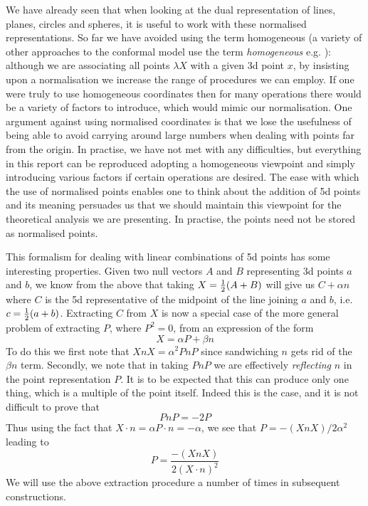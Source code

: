 We have already seen that when looking at the dual representation
of lines, planes, circles and spheres, it is useful to work with
these normalised representations. So far we have avoided using the
term homogeneous (a variety of other approaches to the conformal
model use the term \emph{homogeneous} e.g. \cite{oldwine}):
although we are associating all points $\lambda X$ with a given 3d
point $x$, by insisting upon a normalisation we increase the range
of procedures we can employ. If one were truly to use homogeneous
coordinates then for many operations there would be a variety of
factors to introduce, which would mimic our normalisation. One
argument against using normalised coordinates is that we lose the
usefulness of being able to avoid carrying around large numbers
when dealing with points far from the origin. In practise, we have
not met with any difficulties, but everything in this report can be
reproduced adopting a homogeneous viewpoint and simply introducing
various factors if certain operations are desired. The ease with
which the use of normalised points enables one to think about the
addition of 5d points and its meaning persuades us that we should
maintain this viewpoint for the theoretical analysis we are
presenting. In practise, the points need not be stored as
normalised points.

 This formalism for dealing with linear combinations
of 5d points has some interesting properties. Given two
null vectors $A$ and $B$ representing 3d points $a$ and
$b$, we know from the above that taking $X =\frac{1}{2} (A +
B)$ will give us  $C + \alpha n$ where $C$ is the 5d
representative of the midpoint of the line joining $a$
and $b$, i.e. $c=\frac{1}{2} (a+b)$. Extracting $C$ from $X$ is
now a special case of the more general problem of
extracting $P$, where $P^2=0$, from an expression of the
form
%
\[ X = \alpha P + \beta n   \]
%
To do this we first note that $XnX={\alpha}^2PnP$ since
sandwiching $n$ gets rid of the $\beta n$ term. Secondly,
we note that in taking $PnP$ we are effectively \emph{reflecting} 
$n$ in the point representation $P$. It is to be expected
that this can produce only one thing, which is a multiple
of the point itself. Indeed this is the case, and it is
not difficult to prove that
%
\[  PnP = -2P  \]
%
Thus using the fact that $X\cdot n = \alpha P\cdot n =
-\alpha$, we see that $P = -(XnX)/2\alpha^2$ leading to
%
\begin{equation}
  P =  \frac{-(XnX)}{2(X\cdot n)^2}
\end{equation}
%
We will use the above extraction procedure a number of
times in subsequent constructions.


